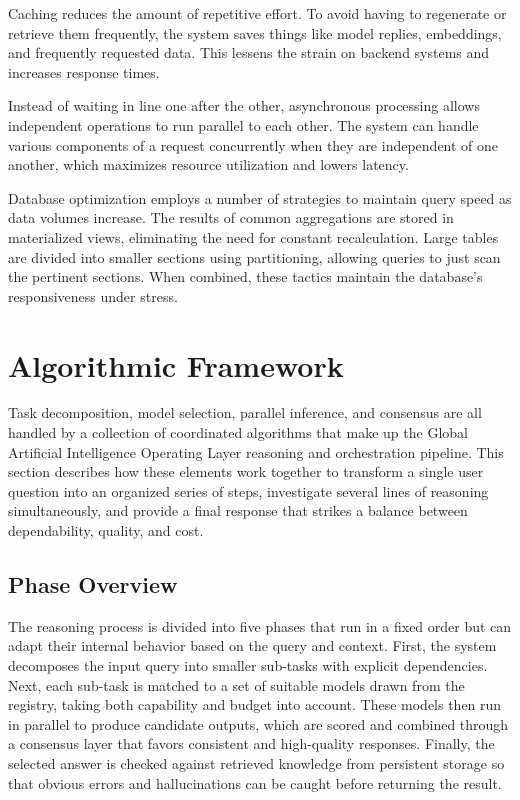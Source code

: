 \documentclass[final,5p,times,twocolumn,authoryear,draft]{elsarticle}
\begin{document}
Caching reduces the amount of repetitive effort. To avoid having to regenerate or retrieve them frequently, the system saves things like model replies, embeddings, and frequently requested data. This lessens the strain on backend systems and increases response times.

Instead of waiting in line one after the other, asynchronous processing allows independent operations to run parallel to each other. The system can handle various components of a request concurrently when they are independent of one another, which maximizes resource utilization and lowers latency.

Database optimization employs a number of strategies to maintain query speed as data volumes increase. The results of common aggregations are stored in materialized views, eliminating the need for constant recalculation. Large tables are divided into smaller sections using partitioning, allowing queries to just scan the pertinent sections. When combined, these tactics maintain the database's responsiveness under stress.

\section{Algorithmic Framework}

Task decomposition, model selection, parallel inference, and consensus are all handled by a collection of coordinated algorithms that make up the Global Artificial Intelligence Operating Layer reasoning and orchestration pipeline. This section describes how these elements work together to transform a single user question into an organized series of steps, investigate several lines of reasoning simultaneously, and provide a final response that strikes a balance between dependability, quality, and cost.


\subsection{Phase Overview}

The reasoning process is divided into five phases that run in a fixed order but can adapt their internal behavior based on the query and context. First, the system decomposes the input query into smaller sub-tasks with explicit dependencies. Next, each sub-task is matched to a set of suitable models drawn from the registry, taking both capability and budget into account. These models then run in parallel to produce candidate outputs, which are scored and combined through a consensus layer that favors consistent and high-quality responses. Finally, the selected answer is checked against retrieved knowledge from persistent storage so that obvious errors and hallucinations can be caught before returning the result.
\end{document}
